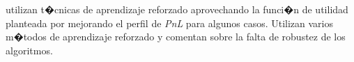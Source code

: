 \documentclass[12pt,a4paper,spanish]{article}%
\begin{document}
\cite{Selser2021} utilizan t�cnicas de aprendizaje reforzado aprovechando la funci�n de utilidad planteada por \cite{Avellaneda2008} mejorando el perfil de \textit{PnL} para algunos casos. Utilizan varios m�todos de aprendizaje reforzado y comentan sobre la falta de robustez de los algoritmos.

\end{document}
